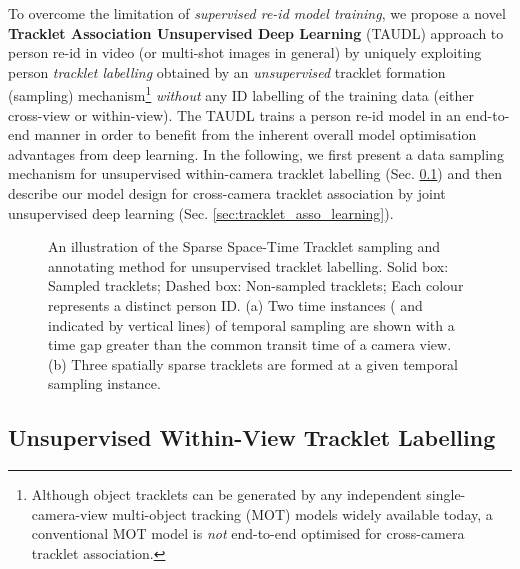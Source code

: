 \documentclass[runningheads]{llncs}
\begin{document}
To overcome the limitation of {\em supervised re-id model training}, 
we propose a novel {\bf Tracklet Association Unsupervised Deep Learning} 
(TAUDL)
approach to person re-id in video (or multi-shot images in general) by
uniquely exploiting person {\em tracklet labelling} obtained by an {\em
  unsupervised} tracklet formation (sampling)
mechanism\footnote{Although object tracklets can be generated by any
  independent single-camera-view multi-object tracking (MOT) models widely
  available today, a conventional MOT model is {\em not} end-to-end optimised for
  cross-camera tracklet association.} {\em without}
any ID labelling of the training data (either cross-view or within-view).
The TAUDL trains a person re-id model in an end-to-end manner in order to
benefit from the inherent overall model optimisation advantages from deep learning.
In the following, we first present a data sampling mechanism for unsupervised
within-camera tracklet labelling (Sec. \ref{sec:tracklet_labelling})
and then describe our model design for cross-camera tracklet association
by joint unsupervised deep learning (Sec. \ref{sec:tracklet_asso_learning}).

\begin{figure}
	\centering
	\caption{An illustration of the Sparse Space-Time Tracklet sampling and annotating method
		for unsupervised tracklet labelling.
		Solid box: Sampled tracklets;
		Dashed box: Non-sampled tracklets;
		Each colour represents a distinct person ID.
		(a) Two time instances ( and 
                indicated by vertical lines) of temporal sampling are shown
		with a time gap  greater than the common transit time  of a camera view. 
		(b) Three spatially sparse tracklets are formed at a
                given temporal sampling instance.
	}
	\label{fig:tracklet_labelling}
\end{figure}





\subsection{Unsupervised Within-View Tracklet Labelling}
\label{sec:tracklet_labelling}
\end{document}

